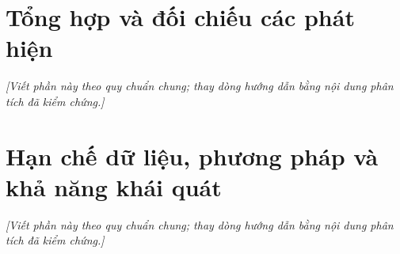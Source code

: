 \section{Tổng hợp và đối chiếu các phát hiện}
\noindent\textit{[Viết phần này theo quy chuẩn chung; thay dòng hướng dẫn bằng nội dung phân tích đã kiểm chứng.]}

\section{Hạn chế dữ liệu, phương pháp và khả năng khái quát}
\noindent\textit{[Viết phần này theo quy chuẩn chung; thay dòng hướng dẫn bằng nội dung phân tích đã kiểm chứng.]}

